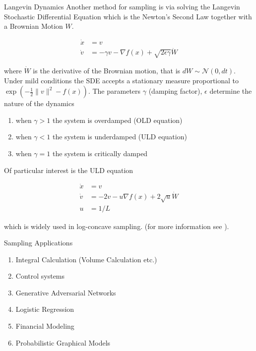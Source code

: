 \documentclass{beamer}
\begin{document}
\begin{frame}[allowframebreaks]{Langevin Dynamics}
    Another method for sampling is via solving the Langevin Stochastic Differential Equation which is the Newton's Second Law together with a Brownian Motion $W$. 
    
    \begin{align*}
        \dot x &= v \\
        \dot v &= - \gamma v - \nabla f(x) + \sqrt {2 \epsilon \gamma} \dot W
    \end{align*}
   
    where $\dot W$ is the derivative of the Brownian motion, that is $d W \sim \mathcal N(0, dt)$. Under mild conditions the SDE accepts a stationary measure proportional to $\exp \left ( - \frac 1 2 \| v \|^2  - f(x) \right )$. The parameters $\gamma$ (damping factor), $\epsilon$ determine the nature of the dynamics
    
    \begin{enumerate}
        \item when $\gamma > 1$ the system is overdamped (OLD equation)
        \item when $\gamma < 1$ the system is underdamped (ULD equation)
        \item when $\gamma = 1$ the system is critically damped
    \end{enumerate}

    \framebreak
    
    Of particular interest is the ULD equation
    
    \begin{align*}
        \dot x & = v \\
        \dot v & = -2v - u \nabla f(x) + 2 \sqrt u \dot W \\
        u & = 1 / L
    \end{align*}
    
    which is widely used in log-concave sampling. (for more information see \cite{lee2020logsmooth, lee2018algorithmic, gryazina2014random}). 
    
\end{frame}

\begin{frame}{Sampling Applications}

\begin{enumerate}
    \item Integral Calculation (Volume Calculation etc.)
    \item Control systems
    \item Generative Adversarial Networks
    \item Logistic Regression
    \item Financial Modeling
    \item Probabilistic Graphical Models
    
\end{enumerate}
    
\end{frame}
\end{document}
